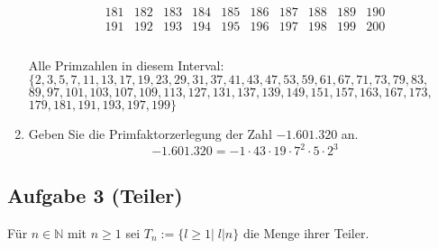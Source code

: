 \documentclass[11pt,a4paper,ngerman]{article}
\newcommand{\N}{\mathbb{N}}
\begin{document}
\begin{enumerate}[\bfseries a)]
$$\begin{array}{cccccccccc}
181 & 182 & 183 & 184 & 185 & 186 & 187 & 188 & 189 & 190 \\
191 & 192 & 193 & 194 & 195 & 196 & 197 & 198 & 199 & 200 \\
\end{array}
$$
\pagebreak \\
Alle Primzahlen in diesem Interval:\\
$\{2, 3, 5, 7, 11 ,13, 17, 19,23, 29, 31, 37, 41, 43, 47, 53, 59, 61, 67, 71, 73, 79, 83,$\\
$ 89, 97, 101, 103, 107, 109, 113, 127, 131, 137, 139, 149, 151, 157, 163, 167, 173,$\\
$ 179, 181, 191, 193, 197, 199\}$\\

\item Geben Sie die Primfaktorzerlegung der Zahl $-1.601.320$ an.\\

$$-1.601.320 = -1 \cdot 43 \cdot 19 \cdot 7^2 \cdot 5 \cdot 2^3$$

\end{enumerate}





\subsection*{Aufgabe 3 (Teiler)}

Für $n \in \N$ mit $n \geq 1$ sei $T_n := \{ l \geq 1 | \; l | n\}$ die Menge ihrer Teiler.
\end{document}
